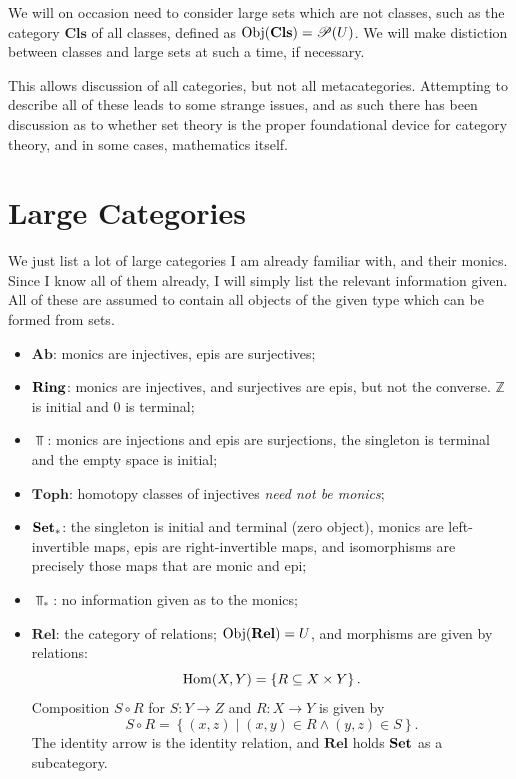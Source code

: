 We will on occasion need to consider large sets which are not classes, such as the category $\mathbf{Cls} $ of all classes, defined as $\operatorname{Obj}(\mathbf{Cls} ) =\mathscr{P} (U)$. We will make distiction between classes and large sets at such a time, if necessary.

This allows discussion of all categories, but not all metacategories. Attempting to describe all of these leads to some strange issues, and as such there has been discussion as to whether set theory is the proper foundational device for category theory, and in some cases, mathematics itself.

\section{Large Categories}

We just list a lot of large categories I am already familiar with, and their monics. Since I know all of them already, I will simply list the relevant information given. All of these are assumed to contain all objects of the given type which can be formed from sets.
\begin{itemize}
	\item $\mathbf{Ab} $: monics are injectives, epis are surjectives;
	\item $\mathbf{Ring} $: monics are injectives, and surjectives are epis, but not the converse. $\mathbb{Z} $ is initial and $0$ is terminal;
	\item $\Top $: monics are injections and epis are surjections, the singleton is terminal and the empty space is initial;
	\item $\mathbf{Toph} $: homotopy classes of injectives \emph{need not be monics};
	\item $\mathbf{Set} _*$: the singleton is initial and terminal (zero object), monics are left-invertible maps, epis are right-invertible maps, and isomorphisms are precisely those maps that are monic and epi;
	\item $\Top _*$: no information given as to the monics;
	\item $\mathbf{Rel}  $: the category of relations; $\operatorname{Obj}(\mathbf{Rel} ) =U$, and morphisms are given by relations:
		\[
			\operatorname{Hom}(X, Y) =\left\{ R\subseteq X\times Y \right\}
		.\]
		Composition $S\circ R$ for $S : Y \to Z$ and $R : X \to Y$ is given by
		\[
			S\circ R=\left\{ (x,z)\mid (x,y)\in R \land (y,z)\in S \right\} 
		.\]
		The identity arrow is the identity relation, and $\mathbf{Rel} $ holds $\mathbf{Set} $ as a subcategory.
\end{itemize}

